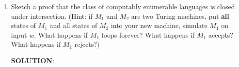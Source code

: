 \documentclass[12pt]{article}
\newcommand{\sol}{\par{\bf SOLUTION}: }
\begin{document}
\begin{enumerate}
\sol %

\item Sketch a proof that the class of computably enumerable languages is closed under intersection. (Hint: if $M_1$ and $M_2$ are two Turing machines, put \textbf{all} states of $M_1$ and all states of $M_2$ into your new machine, simulate $M_1$ on input $w$. What happens if $M_1$ loops forever? What happens if $M_1$ accepts? What happens if $M_1$ rejects?)

\sol %








\end{enumerate}
\end{document}
